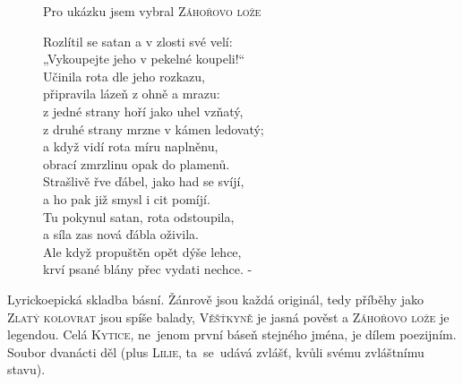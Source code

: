 \documentclass[FGBook.tex]{subfiles}
\begin{document}

\noindent\begin{figure}\footnotesize
{}
\setlength{\parindent}{3pt}
Pro ukázku jsem vybral \textsc{Záhořovo lože}
\begin{center}
\noindent
Rozlítil se satan a v zlosti své velí: \\
„Vykoupejte jeho v pekelné koupeli!“ \\
Učinila rota dle jeho rozkazu, \\
připravila lázeň z ohně a mrazu: \\
z jedné strany hoří jako uhel vzňatý, \\
z druhé strany mrzne v kámen ledovatý; \\
a když vidí rota míru naplněnu, \\
obrací zmrzlinu opak do plamenů. \\
Strašlivě řve ďábel, jako had se svíjí, \\
a ho pak již smysl i cit pomíjí. \\
Tu pokynul satan, rota odstoupila, \\
a síla zas nová ďábla oživila. \\
Ale když propuštěn opět dýše lehce, \\
krví psané blány přec vydati nechce. -
\end{center}
\vspace{3em}
\end{figure}


\noindent 
Lyrickoepická skladba básní.
Žánrově jsou každá originál,
tedy příběhy jako \textsc{Zlatý kolovrat} jsou spíše balady,
\textsc{Věšťkyně} je jasná pověst
a \textsc{Záhořovo lože} je legendou.
Celá \textsc{Kytice}, ne~jenom první báseň stejného jména, je dílem poezijním.
Soubor dvanácti děl (plus \textsc{Lilie}, ta~se~udává zvlášť, kvůli svému zvláštnímu stavu).

\end{document}
